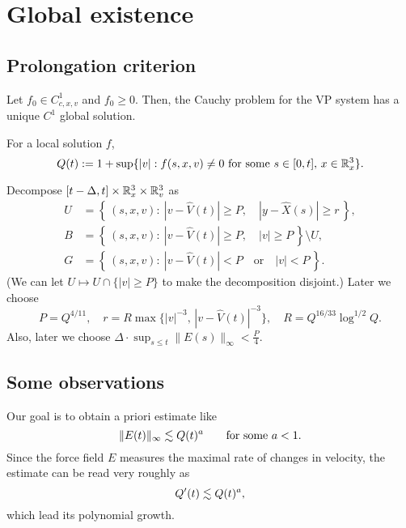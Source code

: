 \documentclass[11pt]{amsart}
\begin{document}
\section{Global existence}


\subsection{Prolongation criterion}

\begin{thm*}[Schaeffer, 1991]
Let $f_0\in C_{c,x,v}^1$ and $f_0\ge0$.
Then, the Cauchy problem for the VP system has a unique $C^1$ global solution.
\end{thm*}

\begin{defn}
For a local solution $f$,
\[Q(t):=1+\sup\{|v|:f(s,x,v)\ne0\text{ for some }s\in[0,t],\,x\in\mathbb{R}_x^3\}.\]
\end{defn}

Decompose $[t-\Delta,t]\times\mathbb{R}_x^3\times\mathbb{R}_v^3$ as
\begin{align*}
U&=\left\{\,(s,x,v):\ |v-\hat V(t)|\ge P,\quad|y-\hat X(s)|\ge r\,\right\},\\
B&=\left\{\,(s,x,v):\ |v-\hat V(t)|\ge P,\quad|v|\ge P\,\right\}\setminus U,\\
G&=\left\{\,(s,x,v):\ |v-\hat V(t)|<P\quad\text{or}\quad|v|<P\,\right\}.
\end{align*}
(We can let $U\mapsto U\cap\{|v|\ge P\}$ to make the decomposition disjoint.)
Later we choose
\[P=Q^{4/11},\quad r=R\max\{|v|^{-3},\,|v-\hat V(t)|^{-3}\},\quad R=Q^{16/33}\log^{1/2}Q.\]
Also, later we choose $\Delta\cdot\sup_{s\le t}\|E(s)\|_\infty<\frac P4$.



\subsection{Some observations}
Our goal is to obtain a priori estimate like
\[\|E(t)\|_\infty\lesssim Q(t)^a\qquad\text{for some }a<1.\]
Since the force field $E$ measures the maximal rate of changes in velocity, the estimate can be read very roughly as
\[Q'(t)\lesssim Q(t)^a,\]
which lead its polynomial growth.
\end{document}
